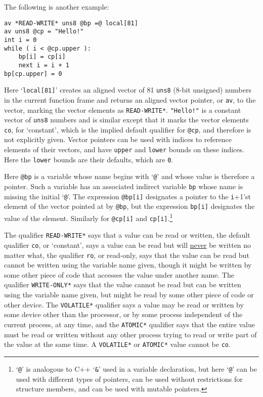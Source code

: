 \documentclass[12pt]{article}
\newenvironment{indpar}[1][0.3in]%
	{\begin{list}{}%
		     {\setlength{\itemsep}{0in}%
		      \setlength{\topsep}{0in}%
		      \setlength{\parsep}{1ex}%
		      \setlength{\labelwidth}{#1}%
		      \setlength{\leftmargin}{#1}%
		      \addtolength{\leftmargin}{\labelsep}}%
	 \item}%
	{\end{list}}
\begin{document}
The following is another example:
\begin{indpar}\begin{verbatim}
av *READ-WRITE* uns8 @bp =@ local[81]
av uns8 @cp = "Hello!"
int i = 0
while ( i < @cp.upper ):
    bp[i] = cp[i]
    next i = i + 1
bp[cp.upper] = 0
\end{verbatim}\end{indpar}

Here `{\tt local[81]}' creates an aligned vector of
81 {\tt uns8} (8-bit unsigned) numbers in the current function
frame and returns an aligned vector pointer, or {\tt av}, to
the vector, marking the vector elements as {\tt *READ-WRITE*}.
{\tt "Hello!"} is a constant vector of {\tt uns8} numbers
and is similar except that it marks the vector elements
{\tt co}, for `constant', which is the implied default qualifier
for {\tt @cp}, and therefore
is not explicitly given.
Vector pointers can be used with indices
to reference elements of their vectors, and have {\tt upper} and
{\tt lower} bounds on these indices.  Here the {\tt lower} bounds
are their defaults, which are {\tt 0}.

Here {\tt @bp} is a variable whose name begins with `{\tt @}' and
whose value is therefore a pointer.  Such a variable has an associated
indirect variable {\tt bp} whose name is missing the initial `{\tt @}'.
The expression {\tt @bp[i]} designates a pointer to the {\tt i}+1'st
element of the vector pointed at by {\tt @bp}, but the expression
{\tt bp[i]} designates the value of the element.  Similarly for
{\tt @cp[i]} and {\tt cp[i]}.\footnote{`{\tt @}' is analogous to
C++ `{\tt \&}' used in a variable declaration, but here `{\tt @}'
can be used with different types of pointers, can be used
without restrictions for structure members, and can be used
with mutable pointers.}

The qualifier {\tt *READ-WRITE*} says that a value can be read or written,
the default qualifier {\tt co}, or `constant',
says a value can be read but will \underline{never} be written no matter what,
the qualifier {\tt ro}, or read-only, says that
the value can be read but
cannot be written using the variable name given, though it might be
written by some other piece of code that accesses the value under another
name.  The qualifier {\tt *WRITE-ONLY*} says that the value cannot be
read but can be written using the variable name given,
but might be read by some other piece of code or other device.
The {\tt *VOLATILE*} qualifier says a value may be
read or written by some device other than the processor, or by some process
independent of the current process, at any time, and the
{\tt *ATOMIC*} qualifier says that the entire value must be read
or written without any other process trying to read or write part of the
value at the same time.
A {\tt *VOLATILE*} or {\tt *ATOMIC*} value cannot be {\tt co}.
\end{document}
